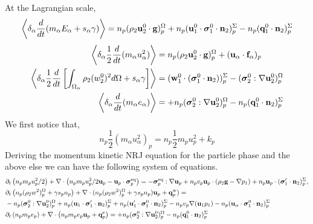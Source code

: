 At the Lagrangian scale, 
\begin{equation*}
    \left<\delta_\alpha \frac{d}{d t} (m_\alpha E_\alpha + s_\alpha \gamma)\right>
    = 
     n_p (\rho_2 \textbf{u}_2^0  \cdot \textbf{g})^\Omega_p
    +n_p (\textbf{u}_1^0 \cdot \bm{\sigma}_1^0 \cdot  \textbf{n}_2)^\Sigma_p
    - n_p (\textbf{q}_1^0 \cdot \textbf{n}_2)^\Sigma_p
\end{equation*}
\begin{align}
    \left<\delta_\alpha \frac{1}{2}\frac{d}{d t} (m_\alpha u_\alpha^2)\right>
    &= 
    n_p (\rho_2 \textbf{u}_2^0 \cdot
    \textbf{g})_p^\Omega
    + 
    (\textbf{u}_\alpha\cdot
    \textbf{f}_\alpha)_p\\
    \left<\delta_\alpha \frac{1}{2}\frac{d}{d t} \left[\int_{\Omega_\alpha} \rho_2 (w_2^0)^2 d\Omega +s_\alpha \gamma\right] \right>
    &= (\textbf{w}_1^0 \cdot (\bm{\sigma}_1^0 \cdot \textbf{n}_2) )_p^\Sigma  
     - (\bm{\sigma}_2^0 : \mathbf{\nabla}\textbf{u}_2^0)_p^\Omega  
    \\
    \left<\delta_\alpha \frac{d}{d t} (m_\alpha e_\alpha )\right>
    &= 
     + n_p (\bm{\sigma}_2^0 : \mathbf{\nabla}\textbf{u}_2^0)^\Omega_p
    -  n_p (\textbf{q}_1^0 \cdot \textbf{n}_2 )_p^\Sigma
\end{align}
We first notice that, 
\begin{equation*}
    n_p\frac{1}{2}(m_\alpha u_\alpha^2)_p
    = n_p\frac{1}{2}m_p u_p^2
    +  k_p
\end{equation*}
Deriving the momentum kinetic NRJ equation for the particle phase and the above else we can have the following system of equations. 
\begin{align*}
    &\partial_t \left(n_p m_p u_p^2/ 2\right)
    + \mathbf{\nabla}\cdot \left(n_p
    m_p u_p^2/ 2 \textbf{u}_p 
    - \textbf{u}_p \cdot \bm{\sigma}_p^\text{eq}
    \right)
    = 
    - \bm{\sigma}_p^\text{eq}  :\mathbf{\nabla} \textbf{u}_p
    +  n_p v_p \textbf{u}_p \cdot (
    \rho_2 \textbf{g}
    - \mathbf{\nabla} p_1 )
    + n_p \textbf{u}_p \cdot (\bm{\sigma}'_1 \cdot \textbf{n}_2)^\Sigma_p,\\
    &\partial_t \left(n_p (\rho_2 w^2 )_p^\Omega+\gamma s_p n_p\right)
    + \mathbf{\nabla}\cdot 
    (n_p (\rho_2 w^2 )_p^\Omega+\gamma s_p n_p)
    \textbf{u}_p 
    +  \textbf{q}_p^\text{w}
    )
    = \\
    &- n_p (\bm{\sigma}_2^0 : \mathbf{\nabla}\textbf{u}_2^0)^\Omega_p
    + n_p (\textbf{u}_1 \cdot \bm{\sigma}_1' \cdot  \textbf{n}_2)^\Sigma_p
    + n_p (\textbf{u}_1' \cdot \bm{\sigma}_1^0 \cdot  \textbf{n}_2)^\Sigma_p
    -n_p v_p \mathbf{\nabla} (\textbf{u}_1p_1)
    - n_p (\textbf{u}_\alpha \cdot \bm{\sigma}_1^0 \cdot  \textbf{n}_2)^\Sigma_p
    \\
    &\partial_t \left(n_p m_p e_p\right)
    + \mathbf{\nabla}\cdot \left(n_p
    m_p e_p \textbf{u}_p 
    +  \textbf{q}_p^\text{e}
    \right)
    = 
    + n_p (\bm{\sigma}_2^0 : \mathbf{\nabla}\textbf{u}_2^0)^\Omega_p
    - n_p (\textbf{q}_1^0\cdot \textbf{n}_2)^\Sigma_p\\
\end{align*}

